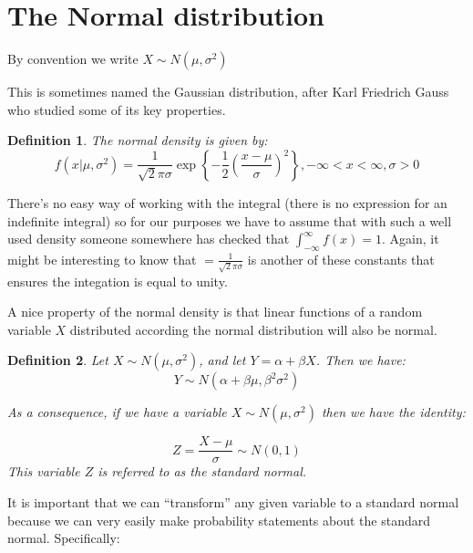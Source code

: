 \documentclass[12pt]{extbook}
\newtheorem{df}{Definition}[section]
\begin{document}
\section{The Normal distribution}

{\color{green}By convention we write $X \sim N(\mu, \sigma^2)$}

This is sometimes named the Gaussian distribution, after Karl Friedrich Gauss who studied some of its key properties.

\begin{df}
The normal density is given by:
\begin{displaymath}
f(x|\mu, \sigma^2)=\frac{1}{\sqrt 2 \pi \sigma} \exp \left\{ -\frac{1}{2} \left(\frac{x-\mu}{\sigma} \right)^2 \right\}, -\infty < x < \infty, \sigma > 0 
\end{displaymath}
\end{df}

There's no easy way of working with the integral (there is no expression for an indefinite integral) so for our purposes we have to assume that with such a well used density someone somewhere has checked that $\int_{-\infty}^{\infty}f(x)=1$.  Again, it might be interesting to know that $=\frac{1}{\sqrt 2 \pi \sigma}$ is another of these constants that ensures the integation is equal to unity.







A nice property of the normal density is that linear functions of a random variable $X$ distributed according the normal distribution will also be normal.

\begin{df}
Let $X \sim N(\mu, \sigma^2)$, and let $Y=\alpha + \beta X$.   Then we have:
\begin{displaymath}
Y \sim N(\alpha + \beta \mu, \beta^2\sigma^2)
\end{displaymath}

As a consequence, if we have a variable $X \sim N(\mu, \sigma^2)$ then we have the identity:

\begin{displaymath}
Z = \frac{X-\mu}{\sigma} \sim N(0,1)
\end{displaymath}
This variable $Z$ is referred to as the \emph{standard normal}.
\end{df}

It is important that we can ``transform'' any given variable to a standard normal because we can very easily make probability statements about the standard normal.   Specifically:
\end{document}
